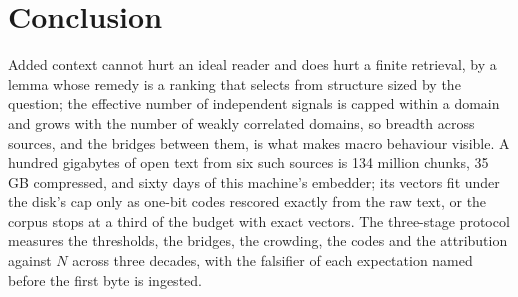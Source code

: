 \documentclass[11pt]{article}
\theoremstyle{plain}
\theoremstyle{definition}
\theoremstyle{remark}
\begin{document}
\section{Conclusion}
Added context cannot hurt an ideal reader and does hurt a finite retrieval, by a lemma whose remedy
is a ranking that selects from structure sized by the question; the effective number of independent
signals is capped within a domain and grows with the number of weakly correlated domains, so breadth
across sources, and the bridges between them, is what makes macro behaviour visible. A hundred
gigabytes of open text from six such sources is 134 million chunks, 35 GB compressed, and sixty days
of this machine's embedder; its vectors fit under the disk's cap only as one-bit codes rescored
exactly from the raw text, or the corpus stops at a third of the budget with exact vectors. The
three-stage protocol measures the thresholds, the bridges, the crowding, the codes and the
attribution against $N$ across three decades, with the falsifier of each expectation named before
the first byte is ingested.



\end{document}
